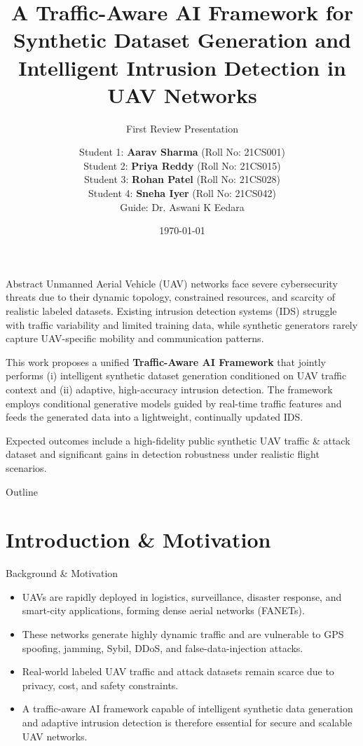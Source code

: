 \documentclass[10pt]{beamer}
\title[UAV-TAID Framework]{A Traffic-Aware AI Framework for Synthetic Dataset Generation and Intelligent Intrusion Detection in UAV Networks}
\subtitle{First Review Presentation}
\author{%
\begin{tabular}{c}
Student 1: \textbf{Aarav Sharma} (Roll No: 21CS001) \\
Student 2: \textbf{Priya Reddy} (Roll No: 21CS015) \\
Student 3: \textbf{Rohan Patel} (Roll No: 21CS028) \\
Student 4: \textbf{Sneha Iyer} (Roll No: 21CS042) \\[0.4em]
Guide: Dr. Aswani K Eedara
\end{tabular}
}
\institute{Your Department \\ Your Institution \\ Tadepalle, Andhra Pradesh, India}
\date{\today}
\begin{document}
\begin{frame}
    \titlepage
\end{frame}

\begin{frame}{Abstract}
    Unmanned Aerial Vehicle (UAV) networks face severe cybersecurity threats due to their dynamic topology, constrained resources, and scarcity of realistic labeled datasets. Existing intrusion detection systems (IDS) struggle with traffic variability and limited training data, while synthetic generators rarely capture UAV-specific mobility and communication patterns. 
    
    This work proposes a unified \textbf{Traffic-Aware AI Framework} that jointly performs (i) intelligent synthetic dataset generation conditioned on UAV traffic context and (ii) adaptive, high-accuracy intrusion detection. The framework employs conditional generative models guided by real-time traffic features and feeds the generated data into a lightweight, continually updated IDS. 
    
    Expected outcomes include a high-fidelity public synthetic UAV traffic \& attack dataset and significant gains in detection robustness under realistic flight scenarios.
\end{frame}

\begin{frame}{Outline}
    \tableofcontents
\end{frame}

\section{Introduction \& Motivation}
\begin{frame}{Background \& Motivation}
    \begin{itemize}
        \item UAVs are rapidly deployed in logistics, surveillance, disaster response, and smart-city applications, forming dense aerial networks (FANETs).
        \item These networks generate highly dynamic traffic and are vulnerable to GPS spoofing, jamming, Sybil, DDoS, and false-data-injection attacks.
        \item Real-world labeled UAV traffic and attack datasets remain scarce due to privacy, cost, and safety constraints.
        \item A traffic-aware AI framework capable of intelligent synthetic data generation and adaptive intrusion detection is therefore essential for secure and scalable UAV networks.
    \end{itemize}
\end{frame}
\end{document}
